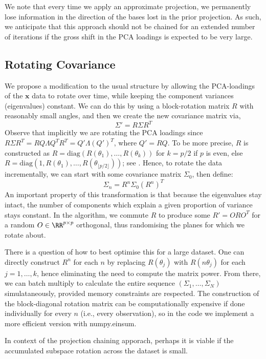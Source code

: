 We note that every time we apply an approximate projection, we permanently lose information in the direction of the bases lost in the prior projection. As such, we anticipate that this approach should not be chained for an extended number of iterations if the gross shift in the PCA loadings is expected to be very large.
\subsection{Rotating Covariance}\label{sec:rotcov}
We propose a modification to the usual structure by allowing the PCA-loadings of the $\bm{x}$ data to rotate over time, while keeping the component variances (eigenvalues) constant. We can do this by using a block-rotation matrix $R$ with reasonably small angles, and then we create the new covariance matrix via,
\[
\Sigma' = R\Sigma R^T    
\]
Observe that implicitly we are rotating the PCA loadings since $R\Sigma R^T = RQ\Lambda Q^TR^T = Q'\Lambda (Q')^T$, where $Q' = RQ$. To be more precise, $R$ is constructed as $R=\mathrm{diag}(R(\theta_1),\dots, R(\theta_k))$ for $k=p/2$ if $p$ is even, else $R = \mathrm{diag}(1, R(\theta_1), \dots, R(\theta_{\lfloor p/2 \rfloor}))$; see \cite{386513}. Hence, to rotate the data incrementally, we can start with some covariance matrix $\Sigma_0$, then define:
\[\Sigma_n = R^n \Sigma_0 (R^n)^T\]
An important property of this transformation is that because the eigenvalues stay intact, the number of components which explain a given proportion of variance stays constant. In the algorithm, we commute $R$ to produce some $R' = ORO^T$ for a random $O\in \RR^{p \times p}$ orthogonal, thus randomising the planes for which we rotate about. 

There is a question of how to best optimise this for a large dataset. One can directly construct $R^n$ for each $n$ by replacing $R(\theta_j)$ with $R(n \theta_j)$ for each $j=1,\dots,k$, hence eliminating the need to compute the matrix power. From there, we can batch multiply to calculate the entire sequence $(\Sigma_1,\dots, \Sigma_N)$ simulataneously, provided memory constraints are respected. The construction of the block-diagonal rotation matrix can be computationally expensive if done individually for every $n$ (i.e., every observation), so in the code we implement a more efficient version with numpy.einsum.

In context of the projection chaining apporach, perhaps it is viable if the accumulated subspace rotation across the dataset is small.